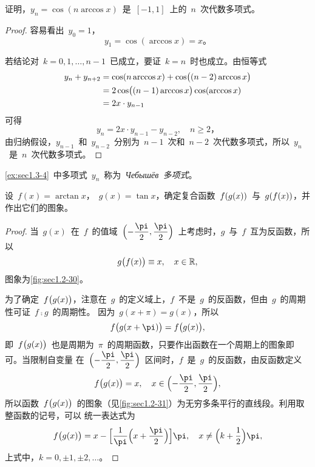 \begin{figure}
\begin{floatrow}[3]
\figurebox{\caption{}\label{fig:sec1.2-29}}
          {\somefigure}
\figurebox{\caption{}\label{fig:sec1.2-30}}
          {\somefigure}
\figurebox{\caption{}\label{fig:sec1.2-31}}
          {\somefigure}
\end{floatrow}
\end{figure}

\begin{example}\label{ex:sec1.3-4}
证明，$y_n=\cos(n\arccos x)$~是~$[-1,1]$~上的~$n$~次代数多项式。
\end{example}
\begin{proof}
容易看出~$y_0=1$，
\[
  y_1=\cos(\arccos x)=x。
\]

若结论对~$k=0,1,\dotsc,n-1$~已成立，要证~$k=n$~时也成立。由恒等式
\begin{align*}
y_n+y_{n+2}
&=\cos(n\arccos x)+\cos\bigl\lparen(n-2)\arccos x\bigr\rparen\\
&=2\cos\bigl\lparen(n-1)\arccos x\bigr\rparen\cos(\arccos x)\\
&=2x\cdot y_{n-1}
\end{align*}
可得
\[
  y_n=2x\cdot y_{n-1}-y_{n-2},\quad n\geq2，
\]
由归纳假设，$y_{n-1}$~和~$y_{n-2}$~分别为~$n-1$~次和~$n-2$~次代数多项式，所以~$y_n$~是~$n$~次代数多项式。
\end{proof}

\ref{ex:sec1.3-4}~中多项式~$y_n$~称为~\emph{Чебышёв~多项式}。

\begin{example}
设~$f(x)=\arctan x$，~$g(x)=\tan x$，确定复合函数~$f\lparen g(x)\rparen$~与~$g\lparen f(x)\rparen$，并作出它们的图象。
\end{example}
\begin{proof}
当~$g(x)$~在~$f$~的值域~$\Paren[\Big]{-\dfrac\pi2,\dfrac\pi2}$~上考虑时，$g$~与~$f$~互为反函数，所以
\[
  g\bigl\lparen f(x)\bigr\rparen\equiv x,\quad x\in\mathbb{R},
\]
图象为\ref{fig:sec1.2-30}。

为了确定~$f\bigl\lparen g(x)\bigr\rparen$，注意在~$g$~的定义域上，$f$~不是~$g$~的反函数，但由~$g$~的周期性可证~$f\comp g$~的周期性。%
因为~$g(x+\pi)=g(x)$，所以
\[
  f\Parenb{g(x+\pi)}=f\Parenb{g(x)},
\]
即~$f\bigl\lparen g(x)\bigr\rparen$~也是周期为~$\pi$~的周期函数，只要作出函数在一个周期上的图象即可。当限制自变量
在~$\Paren[\Big]{-\dfrac\pi2,\dfrac\pi2}$~区间时，$f$~是~$g$~的反函数，由反函数定义
\[
  f\Parenb{g(x)}=x,\quad x\in\Paren[\Big]{-\dfrac\pi2,\dfrac\pi2},
\]
所以函数~$f\bigl\lparen g(x)\bigr\rparen$~的图象（见\ref{fig:sec1.2-31}）为无穷多条平行的直线段。利用取整函数的记号，可以
统一表达式为
\[
f\Parenb{g(x)}=x-\Floor[\Big]{\frac1\pi\Paren[\Big]{x+\frac\pi2}}\pi,\quad x\neq\Paren[\Big]{k+\frac12}\pi,
\]
上式中，$k=0,\pm1,\pm2,\dotsc$。
\end{proof}


